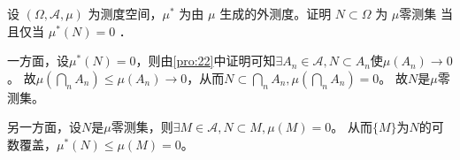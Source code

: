 \documentclass{ctexart}
\begin{document}
\begin{problem}\label{pro:23}
  设 $(\Omega, \mathscr{A}, \mu)$ 为测度空间，$\mu^*$ 为由 $\mu$ 生成的外测度。证明 $N \subset \Omega$ 为 $\mu$零测集
  当且仅当 $\mu^*(N)=0$ ．
\end{problem}

\begin{solution}
  一方面，设\(\mu^*(N)=0 \)，则由\ref{pro:22}中证明可知\(\exists A_n \in \mathcal{A} ,N \subset A_n\)使\(\mu(A_n) \to 0 \)。
  故\(\mu(\bigcap_{n}A_n) \leq \mu(A_n) \to 0 \)，从而\(N \subset \bigcap_{n}A_n,\mu(\bigcap_{n}A_n)=0 \)。
  故\(N \)是\(\mu \)零测集。

  另一方面，设\(N\)是\(\mu \)零测集，则\(\exists M \in \mathcal{A},N \subset M,\mu(M)=0 \)。
  从而\(\{M\} \)为\(N \)的可数覆盖，\(\mu^*(N) \leq \mu(M)=0 \)。
\end{solution}
\end{document}

